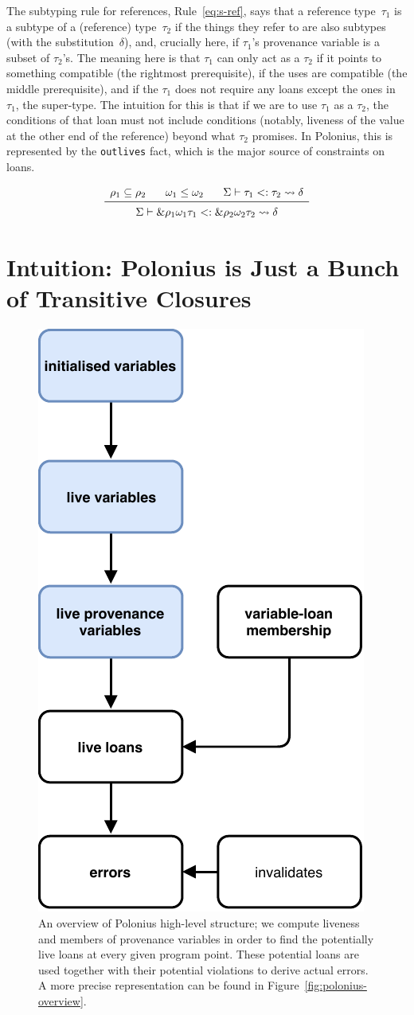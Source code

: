 \documentclass[11pt,a4paper,twoside,openany,draft]{report}
\newcommand{\InDatalog}[1]{\texttt{#1}}
\newcommand{\ntyperule}[2]{\begin{array}{c}#1\\\midrule\raisebox{1pt}{\strut}#2\end{array}}
\begin{document}
The subtyping rule for references, Rule~\eqref{eq:s-ref}, says that a reference
type~$\tau_1$ is a subtype of a (reference) type~$\tau_2$ if the things they
refer to are also subtypes (with the substitution~$\delta$), and, crucially
here, if $\tau_1$'s provenance variable is a subset of $\tau_2$'s. The meaning
here is that $\tau_1$ can only act as a $\tau_2$ if it points to something
compatible (the rightmost prerequisite), if the uses are compatible (the middle
prerequisite), and if the $\tau_1$ does not require any loans except the ones in
$\tau_1$, the super-type. The intuition for this is that if we are to use
$\tau_1$ as a $\tau_2$, the conditions of that loan must not include conditions
(notably, liveness of the value at the other end of the reference) beyond what
$\tau_2$ promises. In Polonius, this is represented by the \InDatalog{outlives}
fact, which is the major source of constraints on loans.

\begin{equation}\label{eq:s-ref}
  \ntyperule{
    \rho_1 \subseteq \rho_2 \:\:\:\:\:\:\:\:
    \omega_1 \leq \omega_2 \:\:\:\:\:\:\:\:
    \Sigma \vdash \tau_1 <: \tau_2 \leadsto \delta
  }
  {
    \Sigma \vdash \&\rho_1 \omega_1 \tau_1 <: \& \rho_2 \omega_2 \tau_2 \leadsto \delta
  }
\end{equation}

\section{Intuition: Polonius is Just a Bunch of Transitive
  Closures}\label{sec:borrow-check-intuition}


\begin{figure}[h!]
  \centering
  \includegraphics[width=0.4\linewidth]{Graphs/polonius-high-level-overview}
  \caption[Polonius High-Level Overview]{An overview of Polonius high-level
    structure; we compute liveness and members of provenance variables in order
    to find the potentially live loans at every given program point. These
    potential loans are used together with their potential violations to derive
    actual errors. A more precise representation can be found in
    Figure~\ref{fig:polonius-overview}.}\label{fig:polonius-high-level-overview}
\end{figure}
\end{document}
